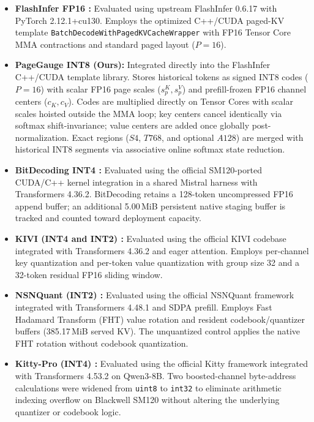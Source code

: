 \documentclass{article}
\begin{document}
\begin{itemize}
    \item \textbf{FlashInfer FP16 \citep{ye2025flashinfer}:} Evaluated using upstream FlashInfer 0.6.17 with PyTorch 2.12.1+cu130. Employs the optimized C++/CUDA paged-KV template \texttt{BatchDecodeWithPagedKVCacheWrapper} with FP16 Tensor Core MMA contractions and standard paged layout ($P=16$).
    \item \textbf{PageGauge INT8 (Ours):} Integrated directly into the FlashInfer C++/CUDA template library. Stores historical tokens as signed INT8 codes ($P=16$) with scalar FP16 page scales ($s_p^K, s_p^V$) and prefill-frozen FP16 channel centers ($c_K, c_V$). Codes are multiplied directly on Tensor Cores with scalar scales hoisted outside the MMA loop; key centers cancel identically via softmax shift-invariance; value centers are added once globally post-normalization. Exact regions ($S4$, $T768$, and optional $A128$) are merged with historical INT8 segments via associative online softmax state reduction.
    \item \textbf{BitDecoding INT4 \citep{du2026bitdecoding}:} Evaluated using the official SM120-ported CUDA/C++ kernel integration in a shared Mistral harness with Transformers 4.36.2. BitDecoding retains a 128-token uncompressed FP16 append buffer; an additional 5.00\,MiB persistent native staging buffer is tracked and counted toward deployment capacity.
    \item \textbf{KIVI (INT4 and INT2) \citep{liu2024kivi}:} Evaluated using the official KIVI codebase integrated with Transformers 4.36.2 and eager attention. Employs per-channel key quantization and per-token value quantization with group size 32 and a 32-token residual FP16 sliding window.
    \item \textbf{NSNQuant (INT2) \citep{son2025nsnquant}:} Evaluated using the official NSNQuant framework integrated with Transformers 4.48.1 and SDPA prefill. Employs Fast Hadamard Transform (FHT) value rotation and resident codebook/quantizer buffers (385.17\,MiB served KV). The unquantized control applies the native FHT rotation without codebook quantization.
    \item \textbf{Kitty-Pro (INT4) \citep{xia2026kitty}:} Evaluated using the official Kitty framework integrated with Transformers 4.53.2 on Qwen3-8B. Two boosted-channel byte-address calculations were widened from \texttt{uint8} to \texttt{int32} to eliminate arithmetic indexing overflow on Blackwell SM120 without altering the underlying quantizer or codebook logic.
\end{itemize}
\end{document}
